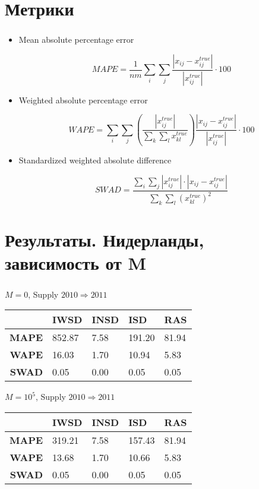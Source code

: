 \documentclass{beamer}
\begin{document}
\section{Метрики}
\begin{frame}
	\frametitle{\insertsection}
	
	\begin{itemize}
	    \item Mean absolute percentage error
	    
	    $$MAPE = \frac{1}{nm}\sum_i\sum_j\frac{|x_{ij} - x_{ij}^{true}|}{|x_{ij}^{true}|} \cdot 100$$
	    
	    \item Weighted absolute percentage error
	    
	    $$WAPE = \sum_i\sum_j\left( \frac{|x_{ij}^{true}|}{\sum_k \sum_l x_{kl}^{true}}\right) \frac{|x_{ij} - x_{ij}^{true}|}{|x_{ij}^{true}|}\cdot100$$
	    
	    \item Standardized weighted absolute difference
	    
	    $$SWAD = \frac{\sum_i \sum_j |x_{ij}^{true}| \cdot |x_{ij} - x_{ij}^{true}|}{\sum_k \sum_l\left( x_{kl}^{true} \right)^2}$$
	    
	\end{itemize}
	
\end{frame}

\section{Результаты. Нидерланды, зависимость от M}
\begin{frame}
	\frametitle{\insertsection}
	
	\begin{center}
		$M=0$, Supply $2010 \Rightarrow 2011$
		\begin{tabular}{|r|m{2cm}|m{2cm}|m{2cm}|m{2cm}|}
			\hline
			& \textbf{IWSD} & \textbf{INSD} & \textbf{ISD} & \textbf{RAS} \\
			\hline
			\textbf{MAPE} & 852.87 & 7.58 & 191.20 & 81.94 \\
			\textbf{WAPE} & 16.03 & 1.70 & 10.94 & 5.83 \\
			\textbf{SWAD} & 0.05 & 0.00 & 0.05 & 0.05 \\
			\hline
		\end{tabular}
	\end{center}
	
	\begin{center}
		$M=10^5$, Supply $2010 \Rightarrow 2011$
		\begin{tabular}{|r|m{2cm}|m{2cm}|m{2cm}|m{2cm}|}
			\hline
			& \textbf{IWSD} & \textbf{INSD} & \textbf{ISD} & \textbf{RAS} \\
			\hline
			\textbf{MAPE} & 319.21 & 7.58 & 157.43 & 81.94 \\
			\textbf{WAPE} & 13.68 & 1.70 & 10.66 & 5.83 \\
			\textbf{SWAD} & 0.05 & 0.00 & 0.05 & 0.05 \\
			\hline
		\end{tabular}
	\end{center}
	
\end{frame}
\end{document}
